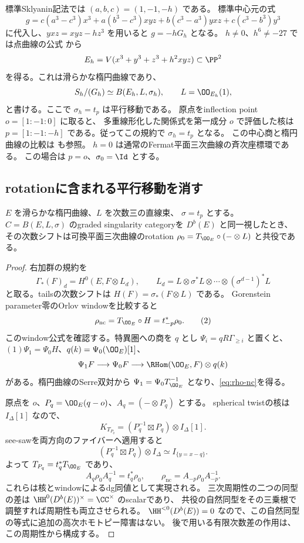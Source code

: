 標準Sklyanin記法では \((a,b,c)=(1,-1,-h)\) である。
標準中心元の式 \cite[Equation (2.16)]{Walton}
\[
 g=c(a^3-c^3)x^3+a(b^3-c^3)xyz+b(c^3-a^3)yxz+c(c^3-b^3)y^3
\]
に代入し、\(yxz=xyz-hz^3\) を用いると \(g=-hG_h\) となる。
\(h\ne0\)、\(h^6\ne-27\) では点曲線の公式
\cite[Theorem 2.14]{Walton}から
\[
 E_h=V(x^3+y^3+z^3+h^2xyz)\subset\PP^2
\]
を得る。これは滑らかな楕円曲線であり、
\[
 S_h/(G_h)\simeq B(E_h,L,\sigma_h),\qquad L=\OO_{E_h}(1),
\]
と書ける。ここで \(\sigma_h=t_p\) は平行移動である。
原点をinflection point \(o=[1:-1:0]\) に取ると、
多重線形化した関係式を第一成分 \(o\) で評価した核は
\(p=[1:-1:-h]\) である。従ってこの規約で \(\sigma_h=t_p\) となる。
この中心商と楕円曲線の比較は \cite[Sections 3.5--3.6]{EG} も参照。
\(h=0\) は通常のFermat平面三次曲線の斉次座標環である。
この場合は \(p=o\)、\(\sigma_0=\Id\) とする。

\subsection{rotationに含まれる平行移動を消す}

\begin{lemma}\label{lem:elliptic-conjugacy}
 \(E\) を滑らかな楕円曲線、\(L\) を次数三の直線束、
 \(\sigma=t_p\) とする。
 \(C=B(E,L,\sigma)\) のgraded singularity categoryを \(D^b(E)\) と同一視したとき、
 その次数シフトは可換平面三次曲線のrotation
 \(\rho_0=T_{\OO_E}\circ(-\otimes L)\) と共役である。
\end{lemma}
\begin{proof}
 右加群の規約を
 \[
 \Gamma_*(F)_d=H^0(E,F\otimes L_d),\qquad
 L_d=L\otimes\sigma^*L\otimes\cdots\otimes(\sigma^{d-1})^*L
 \]
 と取る。tailsの次数シフトは \(H(F)=\sigma_*(F\otimes L)\) である。
 Gorenstein parameter零のOrlov windowを比較すると
 \[
 \rho_{\mathrm{nc}}=T_{\OO_E}\circ H=t_{-p}^*\rho_0.
 \tag{2}\label{eq:rho-nc}
 \]
 このwindow公式を確認する。特異圏への商を \(q\) とし
 \(\Psi_i=qR\Gamma_{\ge i}\) と置くと、
 \((1)\Psi_1=\Psi_0H\)、\(q(k)=\Psi_0(\OO_E)[1]\)、
 \[
 \Psi_1F\longrightarrow\Psi_0F
 \longrightarrow\RHom(\OO_E,F)\otimes q(k)
 \]
 がある。楕円曲線のSerre双対から
 \(\Psi_1=\Psi_0T_{\OO_E}^{-1}\) となり、\eqref{eq:rho-nc}を得る。

 原点を \(o\)、\(P_q=\OO_E(q-o)\)、\(A_q=(-\otimes P_q)\) とする。
 spherical twistの核は \(I_\Delta[1]\) なので、
 \[
 K_{T_{P_q}}=(P_q^{-1}\boxtimes P_q)\otimes I_\Delta[1].
 \]
 see-sawを両方向のファイバーへ適用すると
 \[
 (P_q^{-1}\boxtimes P_q)\otimes I_\Delta
 \simeq I_{\{y=x-q\}}.
 \]
 よって \(T_{P_q}=t_q^*T_{\OO_E}\) であり、
 \[
 A_q\rho_0A_q^{-1}=t_q^*\rho_0,\qquad
 \rho_{\mathrm{nc}}=A_{-p}\rho_0A_{-p}^{-1}.
 \tag{3}\label{eq:conjugacy}
 \]
 これらは核とwindowによるdg同値として実現される。
 三次周期性の二つの同型の差は \(\HH^0(D^b(E))^\times=\CC^\times\) のscalarであり、
 共役の自然同型をその三乗根で調整すれば周期性も両立させられる。
 \(\HH^{<0}(D^b(E))=0\) なので、この自然同型の等式に追加の高次ホモトピー障害はない。
 後で用いる有限次数差の作用は、この周期性から構成する。
\end{proof}

